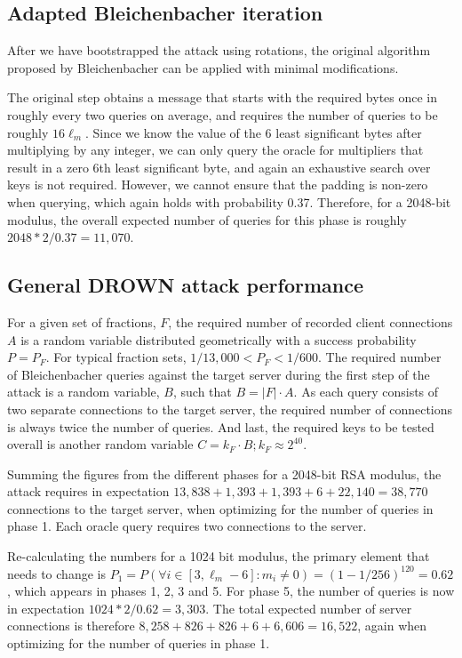 \subsection{Adapted Bleichenbacher iteration}
\label{sec:general-bleichenbacher}
After we have bootstrapped the attack using rotations, the original algorithm proposed by Bleichenbacher can be applied with minimal modifications.

The original step obtains a message that starts with the required  bytes once in roughly every two queries on average, and requires the number of queries to be roughly $16 \ell_m$.
Since we know the value of the 6 least significant bytes after multiplying by any integer, we can only query the oracle for multipliers that result in a zero 6th least significant byte, and again an exhaustive search over keys is not required.
However, we cannot ensure that the padding is non-zero when querying, which again holds with probability 0.37.
Therefore, for a 2048-bit modulus, the overall expected number of queries for this phase is roughly $2048 * 2 / 0.37 = 11,070$.

\ifext
\subsection{General DROWN attack performance}
\label{sec:general-performance}

For a given set of fractions, $F$,
the required number of recorded client connections $A$ is a random variable distributed geometrically with a success probability $P = P_F$.
For typical fraction sets, $1/13,000 < P_F < 1/600$.
The required number of Bleichenbacher queries against the target server during the first step of the attack is a random variable, $B$, such that $B = |F| \cdot A$.
As each query consists of two separate connections to the target server, the required number of connections is always  twice the number of queries.
And last, the required keys to be tested overall is another random variable $C = k_F \cdot B; k_F \approx 2^{40}$.

Summing the figures from the different phases for a 2048-bit RSA modulus, the attack requires in expectation $13,838 + 1,393 + 1,393 + 6 + 22,140 = 38,770$ connections to the target server, when optimizing for the number of queries in phase 1.  Each oracle query requires two connections to the server.

Re-calculating the numbers for a 1024 bit modulus, the primary element that needs to change is $P_1 = P(\forall i \in [3, \ell_m-6]: m_i \neq 0) = (1 - 1/256)^{120} = 0.62$, which appears in phases 1, 2, 3 and 5. For phase 5, the number of queries is now in expectation $1024 * 2 / 0.62 = 3,303$. The total expected number of server connections is therefore $8,258 + 826 + 826 + 6 + 6,606 = 16,522$, again when optimizing for the number of queries in phase 1.

